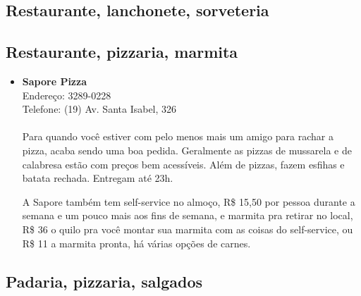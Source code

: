 \subsection{Restaurante, lanchonete, sorveteria}

\subsection{Restaurante, pizzaria, marmita}

\begin{itemize}
\item \textbf{Sapore Pizza}
  \\Endereço: 3289-0228
  \\Telefone: (19) Av. Santa Isabel, 326
  \\
  \\Para quando você estiver com pelo menos mais um amigo para rachar a
  pizza, acaba sendo uma boa pedida. Geralmente as pizzas de mussarela e
  de calabresa estão com preços bem acessíveis. Além de pizzas, fazem
  esfihas e batata rechada. Entregam até 23h.

  A Sapore também tem self-service no almoço, R\$ 15,50 por pessoa
  durante a semana e um pouco mais aos fins de semana, e marmita pra
  retirar no local, R\$ 36 o quilo pra você montar sua marmita com as
  coisas do self-service, ou R\$ 11 a marmita pronta, há várias opções de
  carnes.
\end{itemize}

\subsection{Padaria, pizzaria, salgados}

